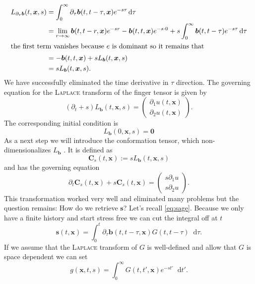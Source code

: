 \documentclass[12pt,a4paper]{scrartcl}
\numberwithin{equation}{section} %
\theoremstyle{definition}
\theoremstyle{plain}
\newcommand{\bfb}{\bm{b}}
\newcommand{\bfs}{\bm{s}}
\newcommand{\bfC}{\bm{C}}
\newcommand{\bfx}{\bm{x}}
\newcommand{\D}{\mathop{}\!\mathrm{d}}
\begin{document}
\begin{align}
    L_{\partial_\tau\bfb}(t,\bfx,s) &= \int_0^\infty\partial_\tau\bfb(t,t-\tau,\bfx)e^{-s\tau}\D\tau\\ &=\lim_{r\to\infty}\bfb(t,t-r,\bfx)e^{-sr}-\bfb(t,t,\bfx)e^{-s\cdot 0}+s\int_0^\infty\bfb(t,t-\tau)e^{-s\tau}\D\tau\\
    \intertext{the first term vanishes because $e$ is dominant so it remains that}
    &= -\bfb(t,t,\bfx) +sL_{\bfb}(t,\bfx, s)\\
    &= sL_{\bfb}(t,\bfx,s).
\end{align}
We have successfully eliminated the time derivative in $\tau$ direction. The governing equation for the \textsc{Laplace} transform of the finger tensor is given by
\begin{equation}
(\partial_t +s)L_{\bfb}(t,\bfx,s) = \begin{pmatrix}
\partial_1 u(t,\bfx)\\\partial_2 u(t,\bfx)
\end{pmatrix}.
\end{equation}
The corresponding initial condition is 
\begin{equation}
    L_{\bfb}(0,\bfx,s) = \bm{0}
\end{equation} 
As a next step we will introduce the conformation tensor, which non-dimensionalizes $L_{\bfb}$ . It is defined as 
\begin{equation}
    \bfC_s(t,\bfx) := sL_{\bfb}(t,\bfx,s)
\end{equation}
and has the governing equation
\begin{equation}
    \partial_t\bfC_s(t,\bfx)+s\bfC_s(t,\bfx) =\begin{pmatrix}
    s\partial_1u\\s\partial_2 u
    \end{pmatrix}.
\end{equation}
This transformation worked very well and eliminated many problems but the question remains: How do we retrieve $\bfs$?
Let's recall \eqref{eq:sage}.
Because we only have a finite history and start stress free we can cut the integral off at $t$
\begin{equation}
    \bfs(t,\bfx)=\int_0^t\partial_\tau\bfb(t,t-\tau,\bfx)G(t,t-\tau)\D\tau.\label{eq:sagered}
\end{equation}
If we assume that the \textsc{Laplace} transform of $G$ is well-defined and allow that $G$ is space dependent we can set
\begin{equation}
    g(\bfx,t,s) =\int_0^\infty G(t,t',\bfx)e^{-st'}\D t'.
\end{equation}
\end{document}
